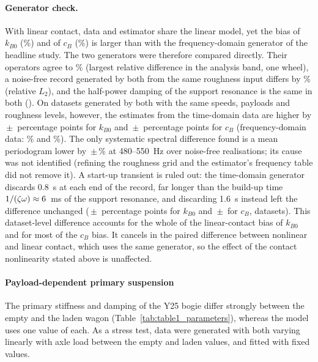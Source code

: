 \paragraph{Generator check.} With linear contact, data and estimator share the linear model, yet the
bias of $k_{B0}$ (\ICLinBias\%) and of $c_B$ (\ICLincBBias\%) is larger than with the
frequency-domain generator of the headline study. The two generators were therefore compared directly. Their operators agree to
\GenOpMisfitPct\% (largest relative difference in the analysis band, one wheel), a noise-free record
generated by both from the same roughness input differs by \GenRecMisfitPct\% (relative $L_2$), and the
half-power damping of the support resonance is the same in both (\GenZetaHP). On \GenN{} datasets
generated by both with the same speeds, payloads and roughness levels, however, the estimates from the
time-domain data are higher by \GenkB\,$\pm$\,\GenkBSE{} percentage points for $k_{B0}$ and
\GencB\,$\pm$\,\GencBSE{} percentage points for $c_B$ (frequency-domain data: \ICFDBias\% and
\ICFDcBBias\%). The only systematic spectral difference found is a mean periodogram lower by
\GenPgramDiff\,$\pm$\,\GenPgramDiffSE\% at 480--550~Hz over \GenPgramN{} noise-free realisations; its cause was not
identified (refining the roughness grid and the estimator's frequency table did not remove it). A
start-up transient is ruled out: the time-domain generator discards 0.8~s at each end of the record,
far longer than the build-up time $1/(\zeta\omega)\approx6$~ms of the support resonance, and
discarding 1.6~s instead left the difference unchanged (\GenPadkB\,$\pm$\,\GenPadkBSE{} percentage
points for $k_{B0}$ and \GenPadcB\,$\pm$\,\GenPadcBSE{} for $c_B$, \GenPadN{} datasets). This
dataset-level difference accounts for the whole of the linear-contact bias of $k_{B0}$ and for most of
the $c_B$ bias. It cancels in the paired difference between nonlinear and linear
contact, which uses the same generator, so the effect of the contact nonlinearity stated above is
unaffected.

\paragraph{Payload-dependent primary suspension}\label{sec:res-primary}
The primary stiffness and damping of the Y25 bogie differ strongly between the empty and the laden wagon
(Table~\ref{tab:table1_parameters}), whereas the model uses one value of each. As a stress test, data
were generated with both varying linearly with axle load between the empty and laden values, and fitted
with fixed values.

